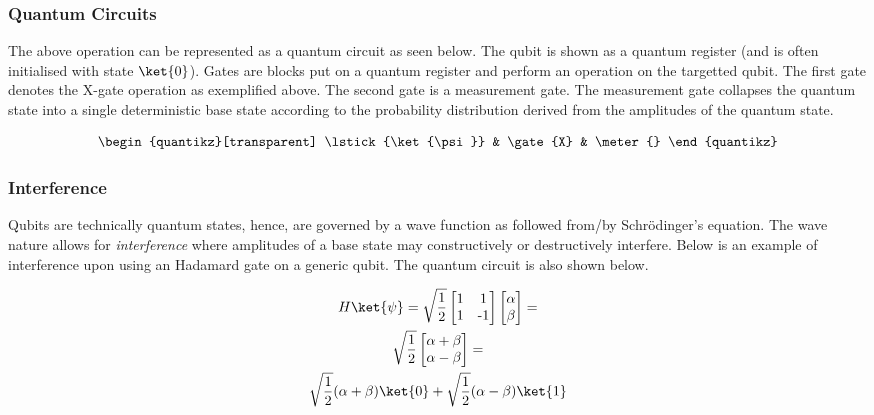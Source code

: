 \documentclass[../main.tex]{subfiles}
\begin{document}
\subsubsection*{Quantum Circuits}
The above operation can be represented as a quantum circuit as seen below. The qubit is shown as a quantum register (and is often initialised with state $\ket{0}$). Gates are blocks put on a quantum register and perform an operation on the targetted qubit. The first gate denotes the X-gate operation as exemplified above. The second gate is a measurement gate. The measurement gate collapses the quantum state into a single deterministic base state according to the probability distribution derived from the amplitudes of the quantum state.

\begin{equation*}
    \begin{quantikz}[transparent]
        \lstick{\ket{\psi}} & \gate{X} & \meter{}
    \end{quantikz}
\end{equation*}

\subsubsection*{Interference}
Qubits are technically quantum states, hence, are governed by a wave function as followed from/by Schrödinger's equation. The wave nature allows for \emph{interference} where amplitudes of a base state may constructively or destructively interfere. Below is an example of interference upon using an Hadamard gate on a generic qubit. The quantum circuit is also shown below.

\begin{gather*}
    H\ket{\psi} =  \sqrt{\frac{1}{2}}\begin{bmatrix} 1 & 1 \\ 1 & \text{-}1 \end{bmatrix} \begin{bmatrix}\alpha \\ \beta \end{bmatrix}  = \\ 
    \sqrt{\frac{1}{2}} \begin{bmatrix}\alpha + \beta \\ \alpha - \beta \end{bmatrix} = \\
    \sqrt{\frac{1}{2}}(\alpha + \beta) \ket{0} + \sqrt{\frac{1}{2}}(\alpha - \beta) \ket{1}
\label{eq: gate_h}
\end{gather*}
\end{document}
